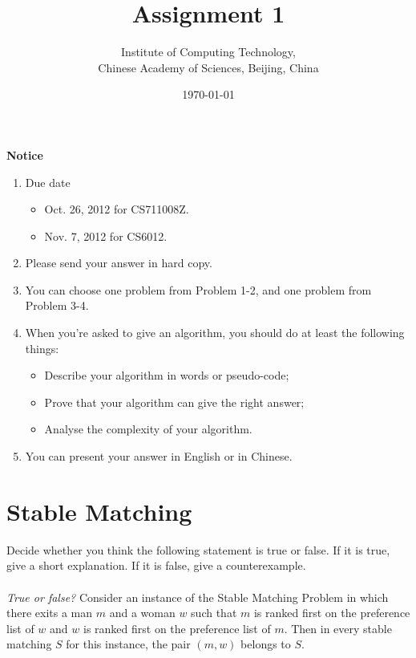 %
%




\title{Assignment 1}
\author{Institute of Computing Technology, \\
        Chinese Academy of Sciences, Beijing, China }
\date{\today}
\maketitle

\noindent
\textbf{Notice}
\begin{enumerate}
\item Due date
      \begin{itemize}
      \item Oct. 26, 2012 for CS711008Z.
      \item Nov. 7, 2012 for CS6012.
      \end{itemize}
\item Please send your answer in hard copy.
\item You can choose one problem from Problem 1-2, and one problem from Problem 3-4.
\item When you're asked to give an algorithm, you should do at least the following things:
      \begin{itemize}
      \item Describe your algorithm in words or pseudo-code;
      \item Prove that your algorithm can give the right answer;
      \item Analyse the complexity of your algorithm.
      \end{itemize}
\item You can present your answer in English or in Chinese.
\end{enumerate}

\section{Stable Matching}
\noindent
Decide whether you think the following statement is true or false. 
If it is true, give a short explanation. 
If it is false, give a counterexample.
\\ \\
\textit{True or false?} Consider an instance of the Stable Matching Problem 
in which there exits a man $m$ and a woman $w$ such that 
$m$ is ranked first on the preference list of $w$ and $w$ is ranked first on the preference list of $m$. 
Then in every stable matching $S$ for this instance, 
the pair $(m, w)$ belongs to $S$.
%
%
